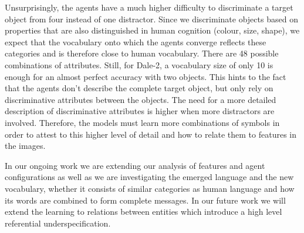\documentclass[11pt]{article}
\begin{document}
Unsurprisingly, the agents have a much higher difficulty to discriminate a target object from four instead of one distractor.
Since we discriminate objects based on properties that are also distinguished in human cognition (colour, size, shape), we expect that the vocabulary onto which the agents converge reflects these categories and is therefore close to human vocabulary.
There are 48 possible combinations of attributes.
Still, for Dale-2, a vocabulary size of only 10 is enough for an almost perfect accuracy with two objects.
This hints to the fact that the agents don't describe the complete target object, but only rely on discriminative attributes between the objects.
The need for a more detailed description of discriminative attributes is higher when more distractors are involved.
Therefore, the models must learn more combinations of symbols in order to attest to this higher level of detail and how to relate them to features in the images.


In our ongoing work we are extending our analysis of features and agent configurations as well as we are investigating the emerged language and the new vocabulary, whether
it consists of similar categories as human language and how its words are combined to form complete messages.
In our future work we will extend the learning to relations between entities which introduce a high level referential underspecification. %

\end{document}
